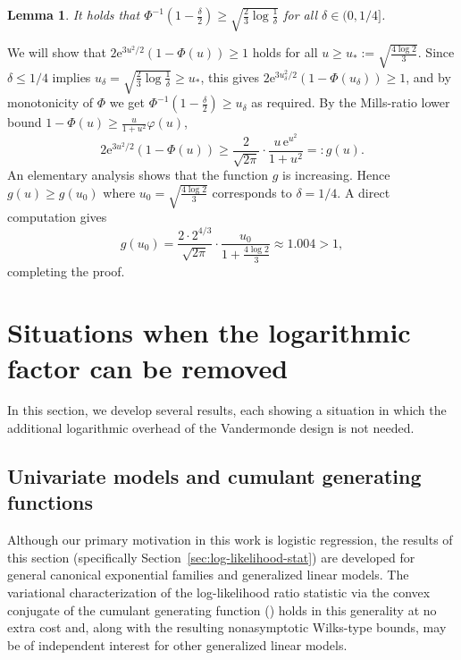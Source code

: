 \documentclass[11pt, letterpaper, hidelinks]{article}
\makeatletter
\renewcommand{\proofname}{\textit{\textbf{Proof}}}
\renewenvironment{proof}[1][\proofname]{\par\pushQED{\qed}\normalfont \topsep6\p@\@plus6\p@\relax\trivlist\item[\hskip\labelsep#1\@addpunct{}]\ignorespaces}{\popQED\endtrivlist\@endpefalse}
\newcommand{\e}{\mathrm{e}}
\newcommand{\1}{\mathbf 1}
\renewcommand{\leq}{\leqslant}
\renewcommand{\geq}{\geqslant}
\theoremstyle{plain}
\newtheorem{lemma}{Lemma}[section]
\theoremstyle{definition}
\makeatother
\begin{document}
\begin{lemma}
\label{lem:mills-ratio-inequality}
It holds that $\Phi^{-1}(1 - \tfrac{\delta}{2}) \geq \sqrt{\tfrac{2}{3} \log \tfrac{1}{\delta}}$ for all $\delta \in (0, 1/4]$.
\end{lemma}
\begin{proof}


We will show that $2 \e^{3u^2/2}(1 - \Phi(u)) \geq 1$ holds for all $u \geq u_* := \sqrt{\tfrac{4\log 2}{3}}$. Since $\delta \leq 1/4$ implies $u_\delta = \sqrt{\tfrac{2}{3}\log\tfrac{1}{\delta}} \geq u_*$, this gives $2\e^{3u_\delta^2/2}(1-\Phi(u_\delta)) \geq 1$, and by monotonicity of $\Phi$ we get $\Phi^{-1}(1 - \tfrac{\delta}{2}) \geq u_\delta$ as required. By the Mills-ratio lower bound $1-\Phi(u) \geq \frac{u}{1+u^2}\varphi(u)$,
\[
2\e^{3u^2/2}(1-\Phi(u)) \geq \frac{2}{\sqrt{2\pi}} \cdot \frac{u\,\e^{u^2}}{1+u^2} =: g(u).
\]
An elementary analysis shows that the function $g$ is increasing. Hence $g(u) \geq g(u_0)$ where $u_0 = \sqrt{\tfrac{4\log 2}{3}}$ corresponds to $\delta = 1/4$. A direct computation gives
\[
g(u_0) = \frac{2\cdot 2^{4/3}}{\sqrt{2\pi}}\cdot \frac{u_0}{1+\tfrac{4\log 2}{3}} \approx 1.004 > 1,
\]
completing the proof.
\end{proof}


\section{Situations when the logarithmic factor can be removed}
\label{sec:logfree}

In this section, we develop several results, each showing a situation in which the additional logarithmic overhead of the Vandermonde design is not needed.

\subsection{Univariate models and cumulant generating functions}
\label{sec:univariatemodels}

Although our primary motivation in this work is logistic regression, the results of this section (specifically Section~\ref{sec:log-likelihood-stat}) are developed for general canonical exponential families and generalized linear models. The variational characterization of the log-likelihood ratio statistic via the convex conjugate of the cumulant generating function () holds in this generality at no extra cost and, along with the resulting nonasymptotic Wilks-type bounds, may be of independent interest for other generalized linear models.
\end{document}
